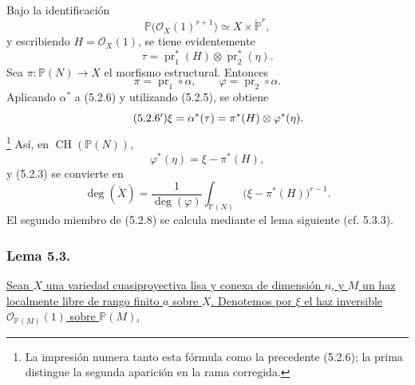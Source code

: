 Bajo la identificación
\[
\mathbb P\bigl(\mathcal O_X(1)^{r+1}\bigr)
\simeq X\times\check{\mathbb P}^{r},
\]
y escribiendo $H=\mathcal O_X(1)$, se tiene evidentemente
\begin{equation}\tag{5.2.6}
\tau=\operatorname{pr}_1^*(H)\otimes\operatorname{pr}_2^*(\eta).
\end{equation}
Sea $\pi:\mathbb P(N)\to X$ el morfismo estructural. Entonces
\[
\pi=\operatorname{pr}_1\circ\alpha,\qquad
\varphi=\operatorname{pr}_2\circ\alpha.
\]
Aplicando $\alpha^*$ a (5.2.6) y utilizando (5.2.5), se obtiene
\begin{equation}\tag{\sisi{5.2.6}{5.2.6$'$}}
\xi=\alpha^*(\tau)=\pi^*(H)\otimes\varphi^*(\eta).
\end{equation}
\footnote{La impresión numera tanto esta fórmula como la precedente
(5.2.6); la prima distingue la segunda aparición en la rama
corregida.}
Así, en $\operatorname{CH}(\mathbb P(N))$,
\begin{equation}\tag{5.2.7}
\varphi^*(\eta)=\xi-\pi^*(H),
\end{equation}
y (5.2.3) se convierte en
\begin{equation}\tag{5.2.8}
\deg(\check X)
=\frac{1}{\deg(\varphi)}
\int_{\mathbb P(N)}\bigl(\xi-\pi^*(H)\bigr)^{r-1}.
\end{equation}
El segundo miembro de (5.2.8) se calcula mediante el lema siguiente
(cf. 5.3.3).

\subsubsection*{Lema 5.3.}
\underline{Sean $X$ una variedad cuasiproyectiva lisa y conexa de
dimensión $n$, y $M$ un haz localmente libre de rango finito $a$
sobre $X$. Denotemos por $\xi$ el haz inversible
$\mathcal O_{\mathbb P(M)}(1)$ sobre $\mathbb P(M)$,}

\pageoriginale

